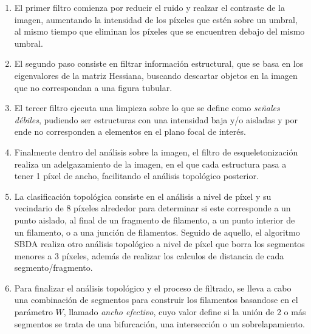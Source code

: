 \begin{enumerate}
    \item El primer filtro comienza por reducir el ruido y realzar el contraste de la imagen, aumentando la intensidad de los p\'ixeles que est\'en sobre un umbral, al mismo tiempo que eliminan los p\'ixeles que se encuentren debajo del mismo umbral.
    \item El segundo paso consiste en filtrar informaci\'on estructural, que se basa en los eigenvalores de la matriz Hessiana, buscando descartar objetos en la imagen que no correspondan a una figura tubular.
    \item El tercer filtro ejecuta una limpieza sobre lo que se define como \textit{se\~nales d\'ebiles}, pudiendo ser estructuras con una intensidad baja y/o aisladas y por ende no corresponden a elementos en el plano focal de inter\'es.
    \item Finalmente dentro del an\'alisis sobre la imagen, el filtro de esqueletonizaci\'on realiza un adelgazamiento de la imagen, en el que cada estructura pasa a tener 1 p\'ixel de ancho, facilitando el an\'alisis topol\'ogico posterior.
    \item La clasificaci\'on topol\'ogica consiste en el an\'alisis a nivel de p\'ixel y su vecindario de 8 p\'ixeles alrededor para determinar si este corresponde a un punto aislado, al final de un fragmento de filamento, a un punto interior de un filamento, o a una junci\'on de filamentos. Seguido de aquello, el algoritmo SBDA realiza otro an\'alisis topol\'ogico a nivel de p\'ixel que borra los segmentos menores a 3 p\'ixeles, adem\'as de realizar los calculos de distancia de cada segmento/fragmento.
    \item Para finalizar el an\'alisis topol\'ogico y el proceso de filtrado, se lleva a cabo una combinaci\'on de segmentos para construir los filamentos basandose en el par\'ametro $W$, llamado \textit{ancho efectivo}, cuyo valor define si la uni\'on de 2 o m\'as segmentos se trata de una bifurcaci\'on, una intersecci\'on o un sobrelapamiento. 
\end{enumerate}

